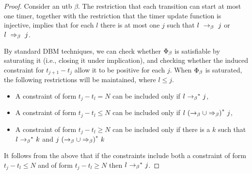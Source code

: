 \begin{proof}
  Consider an utb $\beta$.
The restriction that each transition can start at most one timer, together with
the restriction that the timer update function is injective, implies that
for each $l$ there is at most one $j$ such that
$l \ \rightarrow_{\beta} \  j$ or $l \ \Rightarrow_{\beta}\  j$.

By standard DBM techniques, we can check whether $\Phi_{\beta}$ is satisfiable by saturating it (i.e., closing it under implication),
and checking whether the induced constraint for 
$t_{j+1} - t_j$ allow it to be positive for each $j$.
When $\Phi_{\beta}$ is saturated, the following restrictions
will be maintained, where $l \leq j$.
\begin{itemize}
\item
A constraint of form $t_j -t_l = N$ can be included only if
  $l \ {\rightarrow_{\beta}}^*\  j$,
\item
A constraint of form $t_j -t_l \leq N$ can be included only if
  $l \ {(\rightarrow_{\beta} \cup \Rightarrow_{\beta})}^*\  j$,
\item
  A constraint of form $t_j -t_l \geq N$ can be included only if there is a $k$
  such that
  $l \ {\rightarrow_{\beta}}^*\  k$ and
  $j \ {(\rightarrow_{\beta} \cup \Rightarrow_{\beta})}^*\  k$
\end{itemize}
It follows from the above that if the constraints include both
a constraint of form $t_j -t_l \leq N$ and of form $t_j -t_l \geq N$
then $l \ {\rightarrow_{\beta}}^*\  j$.


\end{proof}
